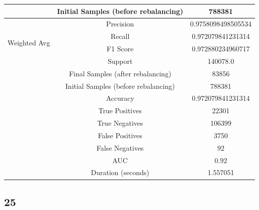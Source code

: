 \begin{longtable}{|c|c|c|}
 & Initial Samples (before rebalancing) & 788381 \\
\hline
\multirow{4}{*}{Weighted Avg} & Precision & 0.9758098498505534 \\
 & Recall & 0.972079841231314 \\
 & F1 Score & 0.972880234960717 \\
 & Support & 140078.0 \\
 & Final Samples (after rebalancing) & 83856 \\
 & Initial Samples (before rebalancing) & 788381 \\
\hline
& Accuracy & 0.972079841231314 \\ \hline
& True Positives & 22301 \\ \hline
& True Negatives & 106399 \\ \hline
& False Positives & 3750 \\ \hline
& False Negatives & 92 \\ \hline
& AUC & 0.92 \\ \hline
& Duration (seconds) & 1.557051 \\ \hline
\end{longtable}


\subsection{25}

